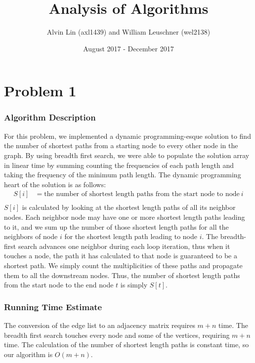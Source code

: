\documentclass{math}
\title{Analysis of Algorithms}
\author{Alvin Lin (axl1439) and William Leuschner (wel2138)}
\date{August 2017 - December 2017}
\begin{document}
\maketitle

\section*{Problem 1}

\subsubsection*{Algorithm Description}
For this problem, we implemented a dynamic programming-esque solution to find
the number of shortest paths from a starting node to every other node in the
graph. By using breadth first search, we were able to populate the solution
array in linear time by summing counting the frequencies of each path length
and taking the frequency of the minimum path length. The dynamic programming
heart of the solution is as follows:
\begin{align*}
  S[i] &= \text{the number of shortest length paths from the start node to node}
    ~i \\
\end{align*}
\( S[i] \) is calculated by looking at the shortest length paths of all its
neighbor nodes. Each neighbor node may have one or more shortest length paths
leading to it, and we sum up the number of those shortest length paths for all
the neighbors of node \( i \) for the shortest length path leading to node
\( i \). The breadth-first search advances one neighbor during each loop
iteration, thus when it touches a node, the path it has calculated to that node
is guaranteed to be a shortest path. We simply count the multiplicities of
these paths and propagate them to all the downstream nodes. Thus, the number of
shortest length paths from the start node to the end node \( t \) is simply
\( S[t] \).

\subsubsection*{Running Time Estimate}
The conversion of the edge list to an adjacency matrix requires \( m+n \) time.
The breadth first search touches every node and some of the vertices, requiring
\( m+n \) time. The calculation of the number of shortest length paths is
constant time, so our algorithm is \( O(m+n) \).
\end{document}
